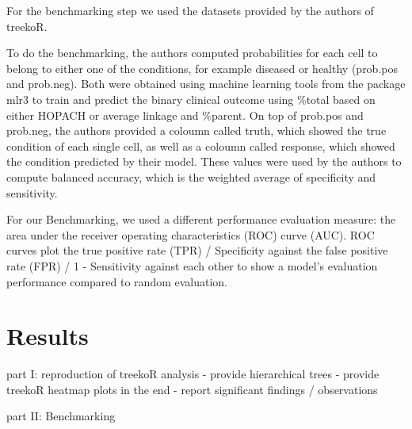 \documentclass[11pt,a4paper,twoside]{report}\usepackage[]{graphicx}\usepackage[]{color}
\makeatletter
\newenvironment{kframe}{%
 \def\at@end@of@kframe{}%
 \ifinner\ifhmode%
  \def\at@end@of@kframe{\end{minipage}}%
  \begin{minipage}{\columnwidth}%
 \fi\fi%
 \def\FrameCommand##1{\hskip\@totalleftmargin \hskip-\fboxsep
 \colorbox{shadecolor}{##1}\hskip-\fboxsep
     \hskip-\linewidth \hskip-\@totalleftmargin \hskip\columnwidth}%
 \MakeFramed {\advance\hsize-\width
   \@totalleftmargin\z@ \linewidth\hsize
   \@setminipage}}%
 {\par\unskip\endMakeFramed%
 \at@end@of@kframe}
\newenvironment{knitrout}{}{} %
\makeatother
\begin{document}
For the benchmarking step we used the datasets provided by the authors of treekoR. %

To do the benchmarking, the authors computed probabilities for each cell to belong to either one of the conditions, for example diseased or healthy (prob.pos and prob.neg). Both were obtained using machine learning tools from the package mlr3 to train and predict the binary clinical outcome using \%total based on either HOPACH or average linkage and \%parent. On top of prob.pos and prob.neg, the authors provided a coloumn called truth, which showed the true condition of each single cell, as well as a coloumn called response, which showed the condition predicted by their model. These values were used by the authors to compute balanced accuracy, which is the weighted average of specificity and sensitivity. %

For our Benchmarking, we used a different performance evaluation measure: the area under the receiver operating characteristics (ROC) curve (AUC). %
ROC curves plot the true positive rate (TPR) / Specificity against the false positive rate (FPR) / 1 - Sensitivity against each other to show a model's evaluation performance compared to random evaluation.




\chapter{Results}\label{sec:results}

part I: reproduction of treekoR analysis
- provide hierarchical trees
- provide treekoR heatmap plots in the end
- report significant findings / observations

part II: Benchmarking

\begin{knitrout}
\color{fgcolor}\begin{kframe}


{\ttfamily\noindent\itshape\color{messagecolor}{\#\# Loading required package: survival}}\end{kframe}
\end{knitrout}





\begin{knitrout}
\color{fgcolor}\begin{kframe}


{\ttfamily\noindent\color{warningcolor}{\#\# Warning in ncases * ncontrols: NAs produced by integer overflow}}\end{kframe}
\end{knitrout}
\end{document}
